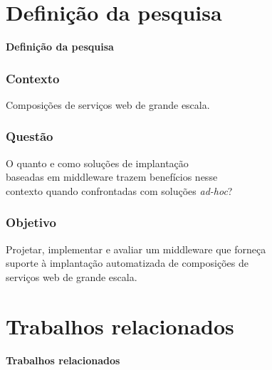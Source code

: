 \documentclass{beamer}
\newcommand\adhoc{\emph{ad-hoc}\xspace}
\newcommand\sectiontitle[1]{\begin{center}\huge\textbf{#1}\end{center}}
\newcommand\frase[1]{\begin{center}\large#1\end{center}}
\begin{document}

\section{Definição da pesquisa}

\begin{frame}

\sectiontitle{Definição da pesquisa}

\end{frame}


\begin{frame}
\frametitle{Contexto}

\frase{Composições de serviços web de grande escala.}

\end{frame}

\begin{frame}
\frametitle{Questão}

\frase{O quanto e como soluções de implantação \\ baseadas em middleware  
trazem benefícios nesse \\ contexto 
quando confrontadas com soluções \adhoc?}

\end{frame}


\begin{frame}
\frametitle{Objetivo}

\frase{Projetar, implementar e avaliar um middleware que forneça \\ suporte à implantação automatizada de  composições de \\ serviços web de grande escala.}

\end{frame}


\section{Trabalhos relacionados}

\begin{frame}

\sectiontitle{Trabalhos relacionados}

\end{frame}
\end{document}
